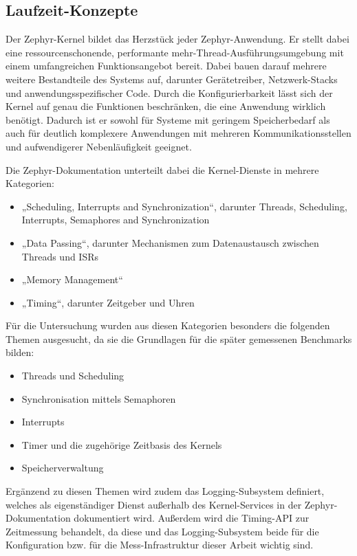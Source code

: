 \subsection{Laufzeit-Konzepte}
Der Zephyr-Kernel bildet das Herzstück jeder Zephyr-Anwendung. Er stellt dabei eine ressourcenschonende, performante mehr-Thread-Ausführungsumgebung mit einem umfangreichen Funktionsangebot bereit. Dabei bauen darauf mehrere weitere Bestandteile des Systems auf, darunter Gerätetreiber, Netzwerk-Stacks und anwendungsspezifischer Code. Durch die Konfigurierbarkeit lässt sich der Kernel auf genau die Funktionen beschränken, die eine Anwendung wirklich benötigt. Dadurch ist er sowohl für Systeme mit geringem Speicherbedarf als auch für deutlich komplexere Anwendungen mit mehreren Kommunikationsstellen und aufwendigerer Nebenläufigkeit geeignet.

Die Zephyr-Dokumentation unterteilt dabei die Kernel-Dienste in mehrere Kategorien:

\begin{itemize}
\item „Scheduling, Interrupts and Synchronization“, darunter Threads, Scheduling, Interrupts, Semaphores and Synchronization
\item „Data Passing“, darunter Mechanismen zum Datenaustausch zwischen Threads und ISRs
\item „Memory Management“
\item „Timing“, darunter Zeitgeber und Uhren
\end{itemize}
Für die Untersuchung wurden aus diesen Kategorien besonders die folgenden Themen ausgesucht, da sie die Grundlagen für die später gemessenen Benchmarks bilden:

\begin{itemize}
\item Threads und Scheduling
\item Synchronisation mittels Semaphoren
\item Interrupts
\item Timer und die zugehörige Zeitbasis des Kernels
\item Speicherverwaltung
\end{itemize}
Ergänzend zu diesen Themen wird zudem das Logging-Subsystem definiert, welches als eigenständiger Dienst außerhalb des Kernel-Services in der Zephyr-Dokumentation dokumentiert wird. Außerdem wird die Timing-API zur Zeitmessung behandelt, da diese und das Logging-Subsystem beide für die Konfiguration bzw. für die Mess-Infrastruktur dieser Arbeit wichtig sind.

